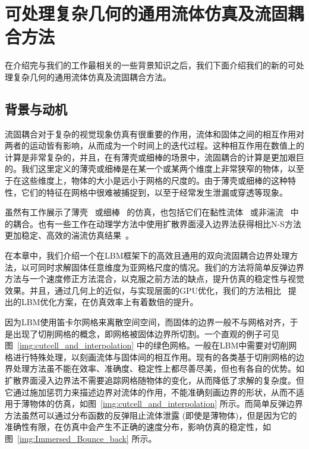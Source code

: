 \chapter{可处理复杂几何的通用流体仿真及流固耦合方法}
\label{chap:siga21}

在介绍完与我们的工作最相关的一些背景知识之后，我们下面介绍我们的新的可处理复杂几何的通用流体仿真及流固耦合方法。

\section{背景与动机}
流固耦合对于复杂的视觉现象仿真有很重要的作用，流体和固体之间的相互作用对两者的运动皆有影响，从而成为一个时间上的迭代过程。这种相互作用在数值上的计算是非常复杂的，并且，在有薄壳或细棒的场景中，流固耦合的计算是更加艰巨的。我们这里定义的薄壳或细棒是在某一个或某两个维度上非常狭窄的物体，以至于在这些维度上，物体的大小是远小于网格的尺度的。由于薄壳或细棒的这种特性，它们的特征在网格中很难被捕捉到，以至于经常发生泄漏或穿透等现象。

虽然有工作展示了薄壳~\citep{DiscreteShells,Bridson:2003} 或细棒~\citep{DiscreteRods} 的仿真，也包括它们在黏性流体~\citep{Fei-2018,Takahashi:2019,Fei-2019} 或非湍流~\citep{Azevedo-2016} 中的耦合。也有一些工作在动理学方法中使用扩散界面浸入边界法获得相比N-S方法更加稳定、高效的湍流仿真结果~\citep{Li-2018,Li-2020}。

在本章中，我们介绍一个在LBM框架下的高效且通用的双向流固耦合边界处理方法，以可同时求解固体任意维度为亚网格尺度的情况。我们的方法将简单反弹边界方法与一个速度修正方法混合，以克服之前方法的缺点，提升仿真的稳定性与视觉效果。并且，通过几何上的近似，与实现层面的GPU优化，我们的方法相比~\citet{Chen-2021} 提出的LBM优化方案，在仿真效率上有着数倍的提升。

因为LBM使用笛卡尔网格来离散空间空间，而固体的边界一般不与网格对齐，于是出现了切削网格的概念，即网格被固体边界所切割。一个直观的例子可见图~\ref{img:cutcell_and_interpolation} 中的绿色网格。一般在LBM中需要对切削网格进行特殊处理，以刻画流体与固体间的相互作用。现有的各类基于切削网格的边界处理方法虽不能在效率、准确度、稳定性上都尽善尽美，但也有各自的优势。如扩散界面浸入边界法不需要追踪网格随物体的变化，从而降低了求解的复杂度。但它通过施加惩罚力来描述边界对流体的作用，不能准确刻画边界的形状，从而不适用于薄物体的仿真，如图~\ref{img:cutcell_and_interpolation} 所示。而简单反弹边界方法虽然可以通过分布函数的反弹阻止流体泄露 (即使是薄物体)，但是因为它的准确性有限，在仿真中会产生不正确的速度分布，影响仿真的稳定性，如图~\ref{img:Immersed_Bounce_back} 所示。

